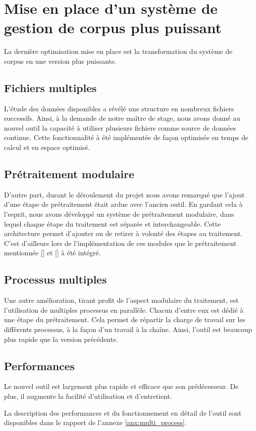 \section{Mise en place d'un système de gestion de corpus plus puissant}
La dernière optimisation mise en place est la transformation du système de corpus en une version plus puissante.

\subsection{Fichiers multiples}
L'étude des données disponibles a révélé une structure en nombreux fichiers successifs.
Ainsi, à la demande de notre maître de stage, nous avons donné au nouvel outil la capacité à utiliser plusieurs fichiers comme source de données continue.
Cette fonctionnalité à été implémentée de façon optimisée en temps de calcul et en espace optimisé.

\subsection{Prétraitement modulaire}
D'autre part, durant le déroulement du projet nous avons remarqué que l'ajout d'une étape de prétraitement était ardue avec l'ancien outil.
En gardant cela à l'esprit, nous avons développé un système de prétraitement modulaire, dans lequel chaque étape du traitement est séparée et interchangeable.
Cette architecture permet d'ajouter ou de retirer à volonté des étapes au traitement.
C'est d'ailleurs lors de l'implémentation de ces modules que le prétraitement mentionnée \autoref{} et \autoref{} à été intégré.

\subsection{Processus multiples}
Une autre amélioration, tirant profit de l'aspect modulaire du traitement, est l'utilisation de multiples processus en parallèle.
Chacun d'entre eux est dédié à une étape du prétraitement.
Cela permet de répartir la charge de travail sur les différents processus, à la façon d'un travail à la chaîne.
Ainsi, l'outil est beaucoup plus rapide que la version précédente.

\subsection{Performances}
Le nouvel outil est largement plus rapide et efficace que son prédécesseur.
De plus, il augmente la facilité d'utilisation et d'entretient.

La description des performances et du fonctionnement en détail de l'outil sont disponibles dans le rapport de l'annexe \ref{anx:multi_process}.
